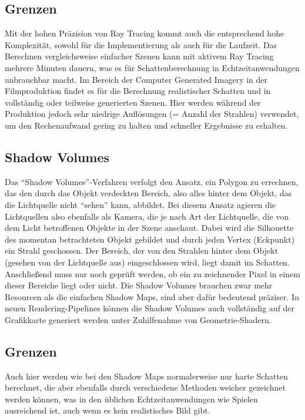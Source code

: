 \subsection*{Grenzen}

Mit der hohen Präzision von Ray Tracing kommt auch die entsprechend hohe Komplexität, sowohl für die
Implementierung als auch für die Laufzeit. Das Berechnen vergleichsweise einfacher Szenen kann mit
aktivem Ray Tracing mehrere Minuten dauern, was es für Schattenberechnung in Echtzeitanwendungen
unbrauchbar macht. Im Bereich der Computer Generated Imagery in der Filmproduktion findet es für die
Berechnung realistischer Schatten und in vollständig oder teilweise generierten Szenen. Hier werden
während der Produktion jedoch sehr niedrige Auflösungen (= Anzahl der Strahlen) verwendet, um den
Rechenaufwand gering zu halten und schneller Ergebnisse zu erhalten.

\subsection{Shadow Volumes}

Das "`Shadow Volumes"'-Verfahren verfolgt den Ansatz, ein Polygon zu errechnen, das den durch das
Objekt verdeckten Bereich, also alles hinter dem Objekt, das die Lichtquelle nicht "`sehen"' kann,
abbildet. Bei diesem Ansatz agieren die Lichtquellen also ebenfalls als
Kamera, die je nach Art der Lichtquelle, die von dem Licht betroffenen Objekte in der Szene anschaut.
Dabei wird die Silhouette des momentan betrachteten Objekt gebildet und durch jeden Vertex (Eckpunkt)
ein Strahl geschossen. Der Bereich, der von den Strahlen hinter dem Objekt (gesehen von der Lichtquelle
aus) eingeschlossen wird, liegt damit im Schatten. Anschließend muss nur noch geprüft werden, ob ein zu
zeichnender Pixel in einem dieser Bereiche liegt oder nicht. Die Shadow Volumes brauchen zwar mehr
Resourcen als die einfachen Shadow Maps, sind aber dafür bedeutend präziser. In neuen Rendering-Pipelines
können die Shadow Volumes auch vollständig auf der Grafikkarte generiert werden unter Zuhilfenahme von
Geometrie-Shadern. \cite{shadowvol2014}

\subsection*{Grenzen}

Auch hier werden wie bei den Shadow Maps normalerweise nur harte Schatten berechnet, die aber ebenfalls
durch verschiedene Methoden weicher gezeichnet werden können, was in den üblichen Echtzeitanwendungen wie
Spielen ausreichend ist, auch wenn es kein realistisches Bild gibt.
